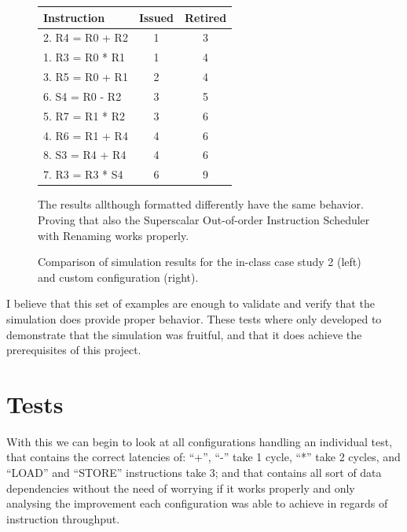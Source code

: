 \documentclass{article}
\begin{document}
\begin{enumerate}
\begin{figure}[H]
\begin{minipage}[t]{0.45\textwidth}
            \setlength{\tabcolsep}{3pt} %
            \begin{tabular}{|p{3.4cm}|c|c|}
                \hline
                \textbf{Instruction} & \textbf{Issued} & \textbf{Retired} \\ \hline
                2. R4 = R0 + R2 & 1 & 3 \\ \hline 
                1. R3 = R0 * R1 & 1 & 4 \\ \hline 
                3. R5 = R0 + R1 & 2 & 4 \\ \hline 
                6. S4 = R0 - R2 & 3 & 5 \\ \hline 
                5. R7 = R1 * R2 & 3 & 6 \\ \hline 
                4. R6 = R1 + R4 & 4 & 6 \\ \hline 
                8. S3 = R4 + R4 & 4 & 6 \\ \hline 
                7. R3 = R3 * S4 & 6 & 9 \\ \hline 
            \end{tabular}
            \vspace{1em} %
            \raggedright

            The results allthough formatted differently have the same behavior. Proving that also the Superscalar Out-of-order Instruction Scheduler with Renaming works properly. 
        \end{minipage}
        \caption{Comparison of simulation results for the in-class case study 2 (left) and custom configuration (right).}
    \end{figure}
\end{enumerate}

I believe that this set of examples are enough to validate and verify that the simulation does provide proper behavior. These tests where only developed to demonstrate that the simulation was fruitful, and that it does achieve the prerequisites of this project. 

\section{Tests}
With this we can begin to look at all configurations handling an individual test, that contains the correct latencies of: ``+'', ``-'' take 1 cycle, ``*'' take 2 cycles, and ``LOAD'' and ``STORE'' instructions take 3; and that contains all sort of data dependencies without the need of worrying if it works properly and only analysing the improvement each configuration was able to achieve in regards of instruction throughput.
\end{document}
